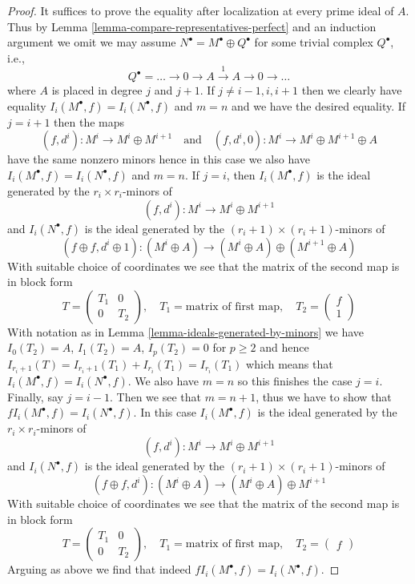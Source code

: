\documentclass[10pt,a4paper]{amsart}
\theoremstyle{plain}
\theoremstyle{definition}
\theoremstyle{remark}
\numberwithin{equation}{subsection}
\begin{document}
\begin{proof}
It suffices to prove the equality after localization at every prime ideal
of $A$. Thus by Lemma \ref{lemma-compare-representatives-perfect}
and an induction argument we omit
we may assume $N^\bullet = M^\bullet \oplus Q^\bullet$
for some trivial complex $Q^\bullet$, i.e.,
$$
Q^\bullet = \ldots \to 0 \to A \xrightarrow{1} A \to 0 \to \ldots
$$
where $A$ is placed in degree $j$ and $j + 1$.
If $j \not = i - 1, i, i + 1$ then we clearly have equality
$I_i(M^\bullet, f) = I_i(N^\bullet, f)$ and $m = n$
and we have the desired equality. If $j = i + 1$ then the maps
$$
(f, d^i) : M^i \to M^i \oplus M^{i + 1}
\quad\text{and}\quad
(f, d^i, 0) : M^i \to M^i \oplus M^{i + 1} \oplus A
$$
have the same nonzero minors hence in this case we also have
$I_i(M^\bullet, f) = I_i(N^\bullet, f)$ and $m = n$. If $j = i$,
then $I_i(M^\bullet, f)$ is the ideal generated by the
$r_i \times r_i$-minors of
$$
(f, d^i) : M^i \to M^i \oplus M^{i + 1}
$$
and $I_i(N^\bullet, f)$ is the ideal generated by
the $(r_i + 1) \times (r_i + 1)$-minors of
$$
(f \oplus f, d^i \oplus 1) :
(M^i \oplus A) \to (M^i \oplus A) \oplus (M^{i + 1} \oplus A)
$$
With suitable choice of coordinates we see that the matrix
of the second map is in block form
$$
T =
\left(
\begin{matrix}
T_1 & 0 \\
0 & T_2
\end{matrix}
\right),
\quad
T_1 = \text{matrix of first map},
\quad
T_2 =
\left(
\begin{matrix}
f \\
1
\end{matrix}
\right)
$$
With notation as in Lemma \ref{lemma-ideals-generated-by-minors}
we have $I_0(T_2) = A$, $I_1(T_2) = A$, $I_p(T_2) = 0$ for $p \geq 2$
and hence $I_{r_i + 1}(T) = I_{r_i + 1}(T_1) + I_{r_i}(T_1) =
I_{r_i}(T_1)$ which means that $I_i(M^\bullet, f) = I_i(N^\bullet, f)$.
We also have $m = n$ so this finishes the case $j = i$.
Finally, say $j = i - 1$. Then we see that $m = n + 1$, thus we have
to show that $fI_i(M^\bullet, f) = I_i(N^\bullet, f)$.
In this case $I_i(M^\bullet, f)$ is the ideal generated by the
$r_i \times r_i$-minors of
$$
(f, d^i) : M^i \to M^i \oplus M^{i + 1}
$$
and $I_i(N^\bullet, f)$ is the ideal generated by
the $(r_i + 1) \times (r_i + 1)$-minors of
$$
(f \oplus f, d^i) : (M^i \oplus A) \to (M^i \oplus A) \oplus M^{i + 1}
$$
With suitable choice of coordinates we see that the matrix
of the second map is in block form
$$
T =
\left(
\begin{matrix}
T_1 & 0 \\
0 & T_2
\end{matrix}
\right),
\quad
T_1 = \text{matrix of first map},
\quad
T_2 =
\left(
\begin{matrix}
f
\end{matrix}
\right)
$$
Arguing as above we find that indeed
$fI_i(M^\bullet, f) = I_i(N^\bullet, f)$.
\end{proof}
\end{document}
